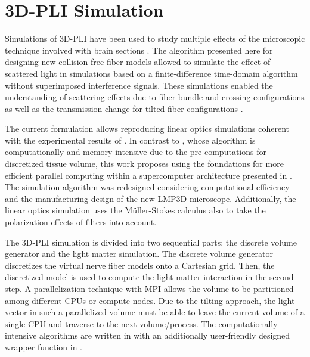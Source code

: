 \cleardoublepage
\setcounter{chapter}{5}
\chapter{\acs{3D-PLI} Simulation}
\label{cha:sof:simulation}
%
Simulations of \ac{3D-PLI} have been used to study multiple effects of the microscopic technique involved with brain sections \cite{Dohmen2015,Menzel2015,Menzel2016,Menzel2020,Menzel2021,MenzelMaster,MenzelDissertation}.
The algorithm presented here for designing new collision-free fiber models allowed to simulate the effect of scattered light in  simulations based on a finite-difference time-domain algorithm without superimposed interference signals.
These simulations enabled the understanding of scattering effects due to fiber bundle and crossing configurations as well as the transmission change for tilted fiber configurations \cite{MenzelDissertation,Menzel2020,Menzel2021}.
\par
% 
The current formulation allows reproducing linear optics simulations coherent with the experimental results of \cite{Dohmen2015,Menzel2015,Menzel2016}.
In contrast to \cite{Dohmen2015,Menzel2015,Menzel2016}, whose algorithm is computationally and memory intensive due to the pre-computations for discretized tissue volume, this work proposes using the foundations for more efficient parallel computing within a supercomputer architecture presented in \cite{Lucksch2016}.
The simulation algorithm was redesigned considering computational efficiency and the manufacturing design of the new \ac{LMP3D} microscope. 
Additionally, the linear optics simulation uses the M{\"u}ller-Stokes calculus also to take the polarization effects of filters into account.
\par
%
The \ac{3D-PLI} simulation is divided into two sequential parts: the discrete volume generator and the light matter simulation.
The discrete volume generator discretizes the virtual nerve fiber models onto a Cartesian grid.
Then, the discretized model is used to compute the light matter interaction in the second step.
A parallelization technique with \ac{MPI} allows the volume to be partitioned among different \acp{CPU} or compute nodes.
Due to the tilting approach, the light vector in such a parallelized volume must be able to leave the current volume of a single \ac{CPU} and traverse to the next volume/process.
The computationally intensive algorithms are written in \cpp{} with an additionally user-friendly designed wrapper function in \python{}.
%
% 
% 
